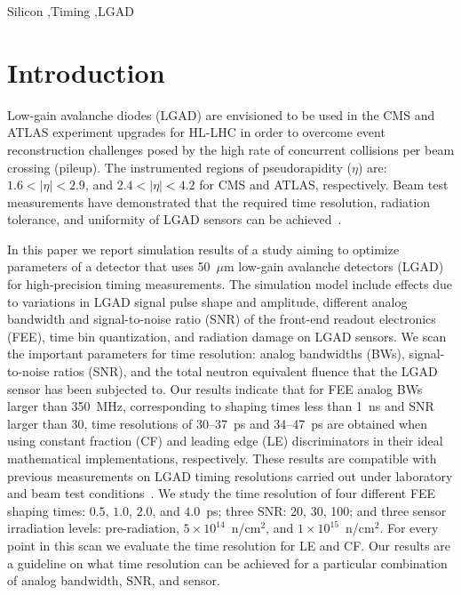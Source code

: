 \documentclass[preprint,1p]{elsarticle}
\begin{document}
\begin{frontmatter}
\begin{keyword}

Silicon \sep Timing \sep LGAD

\end{keyword}

\end{frontmatter}

\tableofcontents


\section{Introduction}

Low-gain avalanche diodes (LGAD) are envisioned to be used in the CMS and ATLAS experiment 
upgrades for HL-LHC in order to overcome event reconstruction challenges posed by the high rate of concurrent
collisions per beam crossing (pileup). The instrumented regions of pseudorapidity ($\eta$)
are: $1.6< |\eta| <2.9$, and $2.4< |\eta|<4.2$ for CMS and ATLAS, respectively.
Beam test measurements have demonstrated that the required time resolution,
radiation tolerance, and uniformity of LGAD sensors can be achieved~\cite{Apresyan:2018oln,Allaire_2018}.

In this paper we report simulation results of a study aiming to optimize 
parameters of a detector that uses 50~$\mu$m low-gain avalanche detectors (LGAD) for
high-precision timing measurements. The simulation model include effects due to variations 
in LGAD signal pulse shape and amplitude, different analog bandwidth and signal-to-noise ratio (SNR) of the front-end readout 
electronics (FEE), time bin quantization, and radiation damage on LGAD sensors.
We scan the important parameters for time resolution: analog bandwidths (BWs),
signal-to-noise ratios (SNR), and the total neutron equivalent fluence that the 
LGAD sensor has been subjected to. Our results indicate that for FEE analog BWs larger than 350~\si{MHz},
corresponding to shaping times less than 1~\si{ns} and SNR larger than 30, time resolutions of 30--37~\si{ps} and 34--47~\si{ps}
are obtained when using constant fraction (CF) and leading edge (LE) discriminators in their ideal mathematical implementations, respectively.
These results are compatible with previous measurements on LGAD timing resolutions carried out under
laboratory and beam test conditions~\cite{Apresyan:2018oln, Cartiglia201783, PELLEGRINI201412}.
We study the time resolution of four different FEE shaping times: $0.5$, $1.0$,
$2.0$, and $4.0$~\si{ps}; three SNR: 20, 30, 100; and three sensor irradiation
levels: pre-radiation, $5\times 10^{14}$~n/cm$^2$, and $1\times 10^{15}$~n/cm$^2$.
For every point in this scan we evaluate the time resolution for LE and CF.
Our results are a guideline on what time resolution can
be achieved for a particular combination of analog bandwidth, SNR, and sensor.
\end{document}
